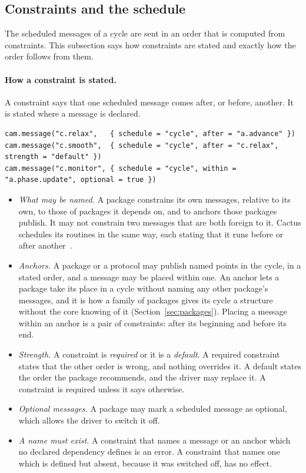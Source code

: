 \documentclass[11pt,a4paper]{article}
\begin{document}
\subsection{Constraints and the schedule}
\label{sec:constraints}

The scheduled messages of a cycle are sent in an order that is computed from
constraints.  This subsection says how constraints are stated and exactly
how the order follows from them.

\paragraph{How a constraint is stated.}  A constraint says that one
scheduled message comes after, or before, another.  It is stated where a
message is declared.

\begin{lstlisting}[language={[5.3]Lua}]
cam.message("c.relax",   { schedule = "cycle", after = "a.advance" })
cam.message("c.smooth",  { schedule = "cycle", after = "c.relax", strength = "default" })
cam.message("c.monitor", { schedule = "cycle", within = "a.phase.update", optional = true })
\end{lstlisting}

\begin{itemize}
  \item \emph{What may be named.}  A package constrains its own messages,
        relative to its own, to those of packages it depends on, and to
        anchors those packages publish.  It may not constrain two messages
        that are both foreign to it.  Cactus schedules its routines in the
        same way, each stating that it runs before or after
        another~\cite{cactusguide}.
  \item \emph{Anchors.}  A package or a protocol may publish named points in
        the cycle, in a stated order, and a message may be placed within
        one.  An anchor lets a package take its place in a cycle without
        naming any other package's messages, and it is how a family of
        packages gives its cycle a structure without the core knowing of it
        (Section~\ref{sec:packages}).  Placing a message within an anchor is
        a pair of constraints: after its beginning and before its end.
  \item \emph{Strength.}  A constraint is \emph{required} or it is a
        \emph{default}.  A required constraint states that the other order
        is wrong, and nothing overrides it.  A default states the order the
        package recommends, and the driver may replace it.  A constraint is
        required unless it says otherwise.
  \item \emph{Optional messages.}  A package may mark a scheduled message as
        optional, which allows the driver to switch it off.
  \item \emph{A name must exist.}  A constraint that names a message or an
        anchor which no declared dependency defines is an error.  A
        constraint that names one which is defined but absent, because it
        was switched off, has no effect.
\end{itemize}
\end{document}

